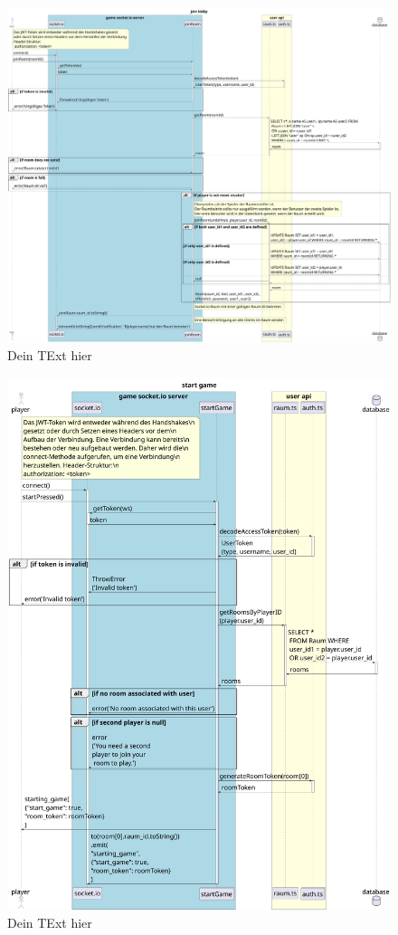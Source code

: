 \documentclass[
]{article}
\begin{document}
\begin{figure}[H]
	\centering
	\includegraphics[width=\textwidth ]{resources/join_lobby.pdf}
	\caption{Dein TExt hier}
	\label{fig:ablaufdiagramm-join_lobby}
\end{figure}
\begin{figure}[H]
	\centering
	\includegraphics[width=\textwidth ]{resources/start_game.pdf}
	\caption{Dein TExt hier}
	\label{fig:ablaufdiagramm-start_game}
\end{figure}
\end{document}
